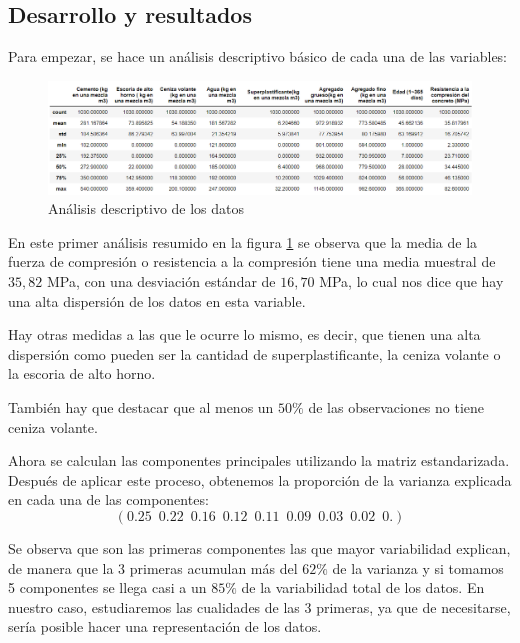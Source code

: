 \subsection*{Desarrollo y resultados}

\noindent Para empezar, se hace un análisis descriptivo básico de cada una de las variables:
\begin{figure}[h]
  \centering
  \includegraphics[scale=0.47]{Documentos Extra/Imagenes/Resumen_Basicos.png}
  \caption{Análisis descriptivo de los datos}
  \label{fig:resumen_basicos}
\end{figure}

\noindent En este primer análisis resumido en la figura \ref{fig:resumen_basicos} se observa que la media de la fuerza de compresión o resistencia a la compresión tiene una media muestral de $35,82$ MPa, con una desviación estándar de $16,70$ MPa, lo cual nos dice que hay una alta dispersión de los datos en esta variable. 

\noindent Hay otras medidas a las que le ocurre lo mismo, es decir, que tienen una alta dispersión como pueden ser la cantidad de superplastificante, la ceniza volante o la escoria de alto horno. 

\noindent También hay que destacar que al menos un $50\%$ de las observaciones no tiene ceniza volante.  

\noindent Ahora se calculan las componentes principales utilizando la matriz estandarizada. Después de aplicar este proceso, obtenemos la proporción de la varianza explicada en cada una de las componentes:
\begin{equation*}
(0.25 \enspace 0.22 \enspace 0.16 \enspace 0.12 \enspace 0.11 \enspace 0.09 \enspace 0.03 \enspace 0.02 \enspace 0.  )
\end{equation*}

\noindent Se observa que son las primeras componentes las que mayor variabilidad explican, de manera que la 3 primeras acumulan más del $62\%$ de la varianza y si tomamos 5 componentes se llega casi a un $85\%$ de la variabilidad total de los datos. En nuestro caso, estudiaremos las cualidades de las 3 primeras, ya que de necesitarse, sería posible hacer una representación de los datos. 

